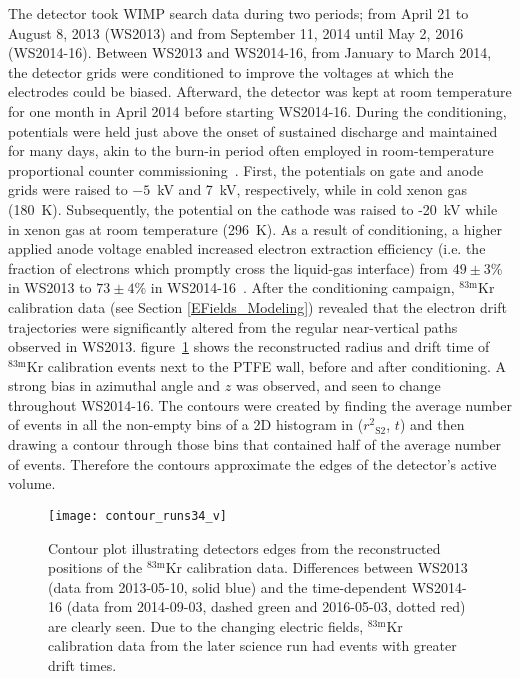 \documentclass[11pt,a4paper]{article}
\newcommand{\isot}[2]{$^{\textrm{#2}}$#1 }
\newcommand{\krm}{\isot{Kr}{83m}}
\newcommand{\subStwo}{$_{\textrm{S2}}$}
\begin{document}
The detector took WIMP search data during two periods; from April 21 to August 8, 2013 (WS2013) and from September 11, 2014 until May 2, 2016 (WS2014-16). Between WS2013 and WS2014-16, from January to March 2014, the detector grids were conditioned to improve the voltages at which the electrodes could be biased. Afterward, the detector was kept at room temperature for one month in April 2014 before starting WS2014-16. During the conditioning, potentials were held just above the onset of sustained discharge and maintained for many days, akin to the burn-in period often employed in room-temperature proportional counter commissioning~\cite{LHCb,ARNISON1990431,DEWULF1988109,AREFIEV198971}. First, the potentials on gate and anode grids were raised to $-5$~kV and 7~kV, respectively, while in cold xenon gas (180~K). Subsequently, the potential on the cathode was raised to -20~kV while in xenon gas at room temperature (296~K). As a result of conditioning, a higher applied anode voltage enabled increased electron extraction efficiency (i.e. the fraction of electrons which promptly cross the liquid-gas interface) from $49\pm3\%$ in WS2013 to $73\pm4\%$ in WS2014-16~\cite{Akerib:2016vxi}. After the conditioning campaign, \krm calibration data (see Section \ref{EFields_Modeling}) revealed that the electron drift trajectories were significantly altered from the regular near-vertical paths observed in WS2013. figure~\ref{fig:contour_runs34} shows the reconstructed radius and drift time of \krm calibration events next to the PTFE wall, before and after conditioning. A strong bias in azimuthal angle and $z$ was observed, and seen to change throughout WS2014-16. The contours were created by finding the average number of events in all the non-empty bins of a 2D histogram in ($r^2$\subStwo, $t$) and then drawing a contour through those bins that contained half of the average number of events. Therefore the contours approximate the edges of the detector's active volume.

\begin{figure}[ht!]
\begin{center}
\texttt{[image: contour\_runs34\_v]}
\caption{Contour plot illustrating detectors edges from the reconstructed positions of the \krm calibration data. Differences between WS2013 (data from 2013-05-10, solid blue) and the time-dependent WS2014-16 (data from 2014-09-03, dashed green and 2016-05-03, dotted red) are clearly seen. Due to the changing electric fields, \krm calibration data from the later science run had events with greater drift times.}
\label{fig:contour_runs34}
\end{center} 
\end{figure}
\end{document}
